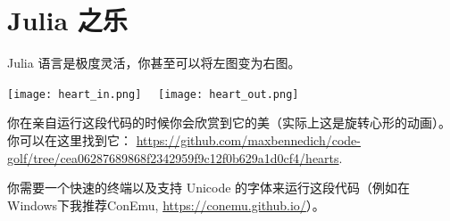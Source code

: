 \documentclass[10pt,a4paper]{article}
\begin{document}
\section{Julia 之乐}

Julia 语言是极度灵活，你甚至可以将左图变为右图。

\begin{center}
\texttt{[image: heart\_in.png]}$\quad$
\texttt{[image: heart\_out.png]}
\end{center}


你在亲自运行这段代码的时候你会欣赏到它的美（实际上这是旋转心形的动画）。
你可以在这里找到它：
\url{https://github.com/maxbennedich/code-golf/tree/cea06287689868f2342959f9c12f0b629a1d0cf4/hearts}.

你需要一个快速的终端以及支持 Unicode 的字体来运行这段代码（例如在Windows下我推荐ConEmu, \url{https://conemu.github.io/}）。
\end{document}
